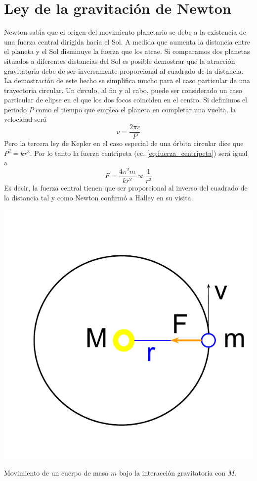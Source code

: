 \section{Ley de la gravitaci\'on de Newton}
Newton sab\'\i{}a que el origen del movimiento planetario se debe a la existencia de una fuerza central dirigida hacia el Sol. A medida que aumenta la distancia entre el planeta y el Sol disminuye la fuerza que los atrae. Si comparamos dos planetas situados a diferentes distancias del Sol es posible demostrar que la atracci\'on gravitatoria debe de ser inversamente proporcional al cuadrado de la distancia.  La demostraci\'on de este hecho se simplifica mucho para el caso particular de una trayectoria circular. Un c\'\i{}rculo, al fin y al cabo, puede ser considerado un caso particular de elipse en el que los dos focos coinciden en el centro. Si definimos el periodo $P$ como el tiempo que emplea el planeta en completar una vuelta, la velocidad ser\'a
\begin{equation}
v=\frac{2\pi r}{P} 
\label{eq:periodo}
\end{equation}
Pero la tercera ley de Kepler en el caso especial de una \'orbita circular dice que $P^{2}=kr^{3}$. Por lo tanto la fuerza centr\'\i{}peta (ec. \ref{eq:fuerza_centripeta}) ser\'a igual a
\begin{equation}
F=\frac{4\pi^{2}m}{kr^{2}} \propto \frac{1}{r^{2}}
\label{eq:gravitacion_1}
\end{equation}
Es decir, la fuerza central tienen que ser proporcional al inverso del cuadrado de la distancia tal y como Newton confirm\'o a Halley en su visita.

\begin{marginfigure}
  \includegraphics[width=\linewidth]{FuerzaCentripetaCirculo.pdf}
  \caption{Movimiento de un cuerpo de masa $m$ bajo la interacci\'on gravitatoria con $M$.}
  \label{fig:MovimientoCircular}
\end{marginfigure}

